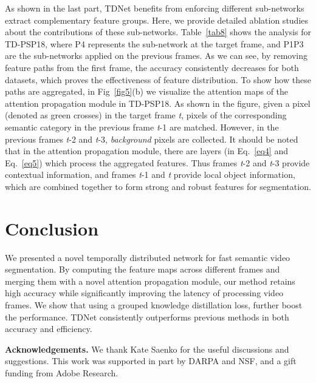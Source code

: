 \documentclass[10pt,twocolumn,letterpaper]{article}
\makeatletter
\renewcommand{\paragraph}{\@startsection{paragraph}{4}{\z@}{2.25ex \@plus 1ex \@minus .2ex}{-1em}{\normalfont\normalsize\bfseries}}
\makeatother
\begin{document}
\paragraph{Effect of Sub-networks.} 
As shown in the last part, TDNet benefits from enforcing different sub-networks extract complementary feature groups.
Here, we provide detailed ablation studies about the contributions of these sub-networks.
Table~\ref{tab8} shows the analysis for TD-PSP18, where P4 represents the sub-network at the target frame, and P1P3 are the sub-networks applied on the previous frames. 
As we can see, by removing feature paths from the first frame, the accuracy consistently decreases for both datasets, which proves the effectiveness of feature distribution. 
To show how these paths are aggregated, in Fig~\ref{fig5}(b) we visualize the attention maps of the attention propagation module in TD-PSP18.
As shown in the figure, given a pixel (denoted as green crosses) in the target frame \textit{t}, pixels of the corresponding semantic category in the previous frame \textit{t}-1 are matched. 
However, in the previous frames \textit{t}-2 and \textit{t}-3, \emph{background} pixels are collected. 
It should be noted that in the attention propagation module, there are layers  (in Eq.~\ref{eq4} and Eq.~\ref{eq5}) which process the aggregated features. 
Thus frames \textit{t}-2 and \textit{t}-3 provide contextual information, and frames \textit{t}-1 and \textit{t} provide local object information, which are combined together to form strong and robust features for segmentation.










 \section{Conclusion}
We presented a novel temporally distributed network for fast semantic video segmentation. 
By computing the feature maps across different frames and merging them with a novel attention propagation module, our method  retains high accuracy while significantly improving the latency of processing video frames. 
We show that using a grouped knowledge distillation loss, further boost the performance. TDNet consistently outperforms previous methods in both accuracy and efficiency.

\noindent \textbf{Acknowledgements.} We thank Kate Saenko for the useful discussions and suggestions. This work was supported in part by DARPA and NSF, and a gift funding from Adobe Research. 
{\small


}
\end{document}

